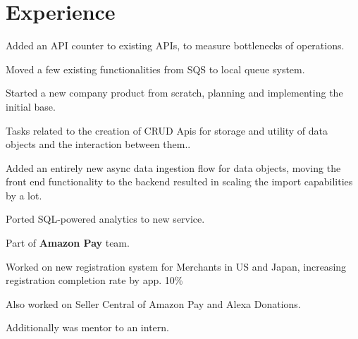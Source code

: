 \documentclass[a4paper]{deedy-resume} %
\begin{document}
\hfill
%
%
\begin{minipage}[t]{0.66\textwidth} %


\section{Experience}


\vspace{\topsep}
\begin{tightitemize}
\item Added an API counter to existing APIs, to measure bottlenecks of operations.
\item Moved a few existing functionalities from SQS to local queue system.
\item Started a new company product from scratch, planning and implementing the initial base.
\item Tasks related to the creation of CRUD Apis for storage and utility of data objects and the interaction between them..
\item Added an entirely new async data ingestion flow for data objects, moving the front end functionality to the backend resulted in scaling the import capabilities by a lot.
\item Ported SQL-powered analytics to new service.
\end{tightitemize}

\secctionspace


\vspace{\topsep}
\begin{tightitemize}
\item Part of \textbf{Amazon Pay} team.
\item Worked on new registration system for Merchants in US and Japan, increasing registration completion rate by app. 10\%
\item Also worked on Seller Central of Amazon Pay and Alexa Donations.
\item Additionally was mentor to an intern.
\end{tightitemize}


\end{minipage}
\end{document}
